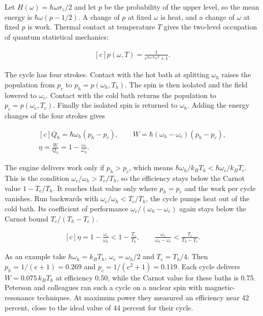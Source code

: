 \documentclass[11pt,oneside]{book}
\newenvironment{centeredalign}{\[\begin{gathered}[c]}{\end{gathered}\]}
\begin{document}
Let \(H(\omega)=\hbar\omega\sigma_z/2\) and let \(p\) be the probability of the upper level, so the mean energy is \(\hbar\omega(p-1/2)\). A change of \(p\) at fixed \(\omega\) is heat, and a change of \(\omega\) at fixed \(p\) is work. Thermal contact at temperature \(T\) gives the two-level occupation of quantum statistical mechanics:

\begin{centeredalign}
p(\omega,T)=\frac{1}{e^{\hbar\omega/k_BT}+1}.
\end{centeredalign}

The cycle has four strokes. Contact with the hot bath at splitting \(\omega_h\) raises the population from \(p_c\) to \(p_h=p(\omega_h,T_h)\). The spin is then isolated and the field lowered to \(\omega_c\). Contact with the cold bath returns the population to \(p_c=p(\omega_c,T_c)\). Finally the isolated spin is returned to \(\omega_h\). Adding the energy changes of the four strokes gives

\begin{centeredalign}
Q_h=\hbar\omega_h(p_h-p_c),\qquad W=\hbar(\omega_h-\omega_c)(p_h-p_c),\\
\eta=\frac{W}{Q_h}=1-\frac{\omega_c}{\omega_h}.
\end{centeredalign}

The engine delivers work only if \(p_h>p_c\), which means \(\hbar\omega_h/k_BT_h<\hbar\omega_c/k_BT_c\). This is the condition \(\omega_c/\omega_h>T_c/T_h\), so the efficiency stays below the Carnot value \(1-T_c/T_h\). It reaches that value only where \(p_h=p_c\) and the work per cycle vanishes. Run backwards with \(\omega_c/\omega_h<T_c/T_h\), the cycle pumps heat out of the cold bath. Its coefficient of performance \(\omega_c/(\omega_h-\omega_c)\) again stays below the Carnot bound \(T_c/(T_h-T_c)\).

\begin{centeredalign}
\eta=1-\frac{\omega_c}{\omega_h}<1-\frac{T_c}{T_h},\qquad
\frac{\omega_c}{\omega_h-\omega_c}<\frac{T_c}{T_h-T_c}.
\end{centeredalign}

As an example take \(\hbar\omega_h=k_BT_h\), \(\omega_c=\omega_h/2\) and \(T_c=T_h/4\). Then \(p_h=1/(e+1)=0.269\) and \(p_c=1/(e^2+1)=0.119\). Each cycle delivers \(W=0.075\,k_BT_h\) at efficiency 0.50, while the Carnot value for these baths is 0.75. Peterson and colleagues ran such a cycle on a nuclear spin with magnetic-resonance techniques. At maximum power they measured an efficiency near 42 percent, close to the ideal value of 44 percent for their cycle.
\end{document}

